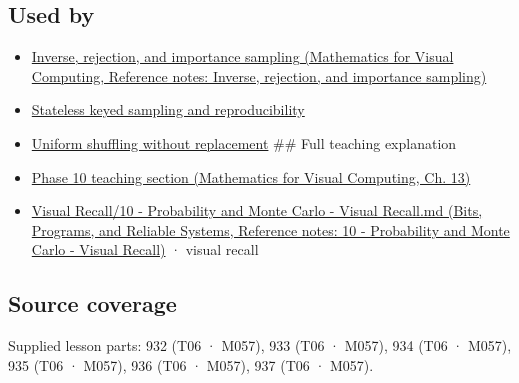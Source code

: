 \subsection{Used by}\label{appendix-e0f7c7e08f3a-used-by}

\begin{itemize}
\item
  \href{../02-Mathematics-for-Visual-Computing/main.pdf\#nameddest=appendix-8d863ed954d0}{Inverse, rejection, and importance sampling (Mathematics for Visual Computing, Reference notes: Inverse, rejection, and importance sampling)}
\item
  \hyperref[appendix-daaf25bfd3a0]{Stateless keyed sampling and reproducibility}
\item
  \hyperref[appendix-184fcc411663]{Uniform shuffling without replacement} \#\# Full teaching explanation
\item
  \href{../02-Mathematics-for-Visual-Computing/main.pdf\#nameddest=02-foundations-ii-ch029-a-computer-produces-deterministic-pseudorandom-sequences}{Phase 10 teaching section (Mathematics for Visual Computing, Ch. 13)}
\item
  \href{../01-Bits-Programs-and-Reliable-Systems/main.pdf\#nameddest=appendix-cb5af353ef77}{Visual Recall/10 - Probability and Monte Carlo - Visual Recall.md (Bits, Programs, and Reliable Systems, Reference notes: 10 - Probability and Monte Carlo - Visual Recall)} · visual recall
\end{itemize}

\subsection{Source coverage}\label{appendix-e0f7c7e08f3a-source-coverage}

Supplied lesson parts: 932 (T06 · M057), 933 (T06 · M057), 934 (T06 · M057), 935 (T06 · M057), 936 (T06 · M057), 937 (T06 · M057).
